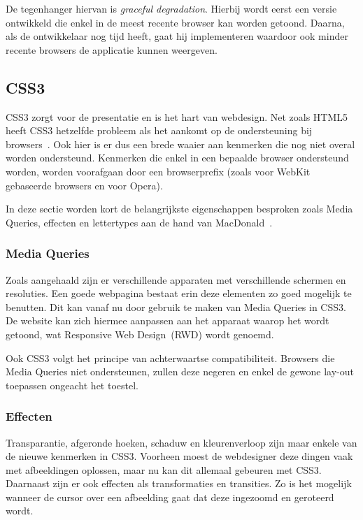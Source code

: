 De tegenhanger hiervan is \emph{graceful degradation}. 
Hierbij wordt eerst een versie ontwikkeld die enkel in de meest recente browser kan worden getoond. 
Daarna, als de ontwikkelaar nog tijd heeft, gaat hij  implementeren waardoor ook minder recente browsers de applicatie kunnen weergeven.

\subsection{CSS3}
\label{ref:css3}
CSS3 zorgt voor de presentatie en is het hart van webdesign. 
Net zoals HTML5 heeft CSS3 hetzelfde probleem als het aankomt op de ondersteuning bij browsers~\cite{MacDonald2011}. 
Ook hier is er dus een brede waaier aan kenmerken die nog niet overal worden ondersteund. 
Kenmerken die enkel in een bepaalde browser ondersteund worden, worden voorafgaan door een browserprefix (zoals  voor WebKit gebaseerde browsers en  voor Opera).

In deze sectie worden kort de belangrijkste eigenschappen besproken zoals Media Queries, effecten en lettertypes aan de hand van MacDonald~\cite{MacDonald2011}.

\subsubsection{Media Queries}
Zoals aangehaald zijn er verschillende apparaten met verschillende schermen en resoluties. 
Een goede webpagina bestaat erin deze elementen zo goed mogelijk te benutten. 
Dit kan vanaf nu door gebruik te maken van Media Queries in CSS3. 
De website kan zich hiermee aanpassen aan het apparaat waarop het wordt getoond, wat  Responsive Web Design~(RWD) wordt genoemd.

Ook CSS3 volgt het principe van achterwaartse compatibiliteit. 
Browsers die Media Queries niet ondersteunen, zullen deze negeren en enkel de gewone lay-out toepassen ongeacht het toestel.

\subsubsection{Effecten}
Transparantie, afgeronde hoeken, schaduw en kleurenverloop zijn maar enkele van de nieuwe kenmerken in CSS3. 
Voorheen moest de webdesigner deze dingen vaak met afbeeldingen oplossen, maar nu kan dit allemaal gebeuren met CSS3. 
Daarnaast zijn er ook effecten als transformaties en transities. 
Zo is het mogelijk wanneer de cursor over een afbeelding gaat dat deze ingezoomd en geroteerd wordt. 


